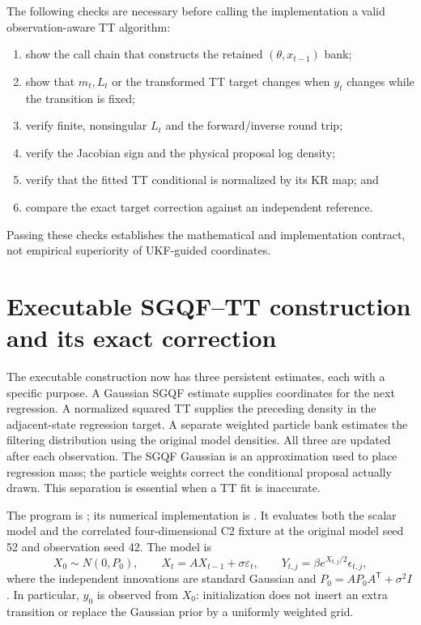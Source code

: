 \documentclass[11pt]{article}
\begin{document}
The following checks are necessary before calling the implementation a valid
observation-aware TT algorithm:
\begin{enumerate}
\item show the call chain that constructs the retained $(\theta,x_{t-1})$
      bank;
\item show that $m_t,L_t$ or the transformed TT target changes when $y_t$
      changes while the transition is fixed;
\item verify finite, nonsingular $L_t$ and the forward/inverse round trip;
\item verify the Jacobian sign and the physical proposal log density;
\item verify that the fitted TT conditional is normalized by its KR map; and
\item compare the exact target correction against an independent reference.
\end{enumerate}
Passing these checks establishes the mathematical and implementation contract,
not empirical superiority of UKF-guided coordinates.

\section{Executable SGQF--TT construction and its exact correction}
\label{sec:executed-sgqf-tt}

The executable construction now has three persistent estimates, each with a
specific purpose. A Gaussian SGQF estimate supplies coordinates for the next
regression. A normalized squared TT supplies the preceding density in the
adjacent-state regression target. A separate weighted particle bank estimates
the filtering distribution using the original model densities. All three are
updated after each observation. The SGQF Gaussian is an approximation used to
place regression mass; the particle weights correct the conditional proposal
actually drawn. This separation is essential when a TT fit is inaccurate.

The program is
; its numerical
implementation is .
It evaluates both the scalar model and the correlated four-dimensional C2
fixture at the original model seed 52 and observation seed 42. The model is
\[
 X_0\sim N(0,P_0),\qquad X_t=A X_{t-1}+\sigma\varepsilon_t,
 \qquad Y_{t,j}=\beta e^{X_{t,j}/2}\epsilon_{t,j},
\]
where the independent innovations are standard Gaussian and
$P_0=A P_0 A^{\mathsf T}+\sigma^2I$. In particular, $y_0$ is observed from
$X_0$: initialization does not insert an extra transition or replace the
Gaussian prior by a uniformly weighted grid.
\end{document}
